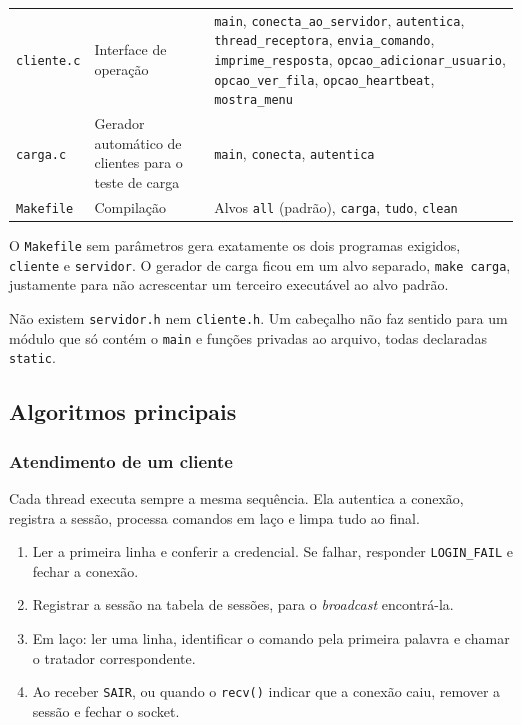 \documentclass[12pt,a4paper]{article}
\begin{document}
{\begin{longtable}{L{2.8cm} L{4.1cm} L{6.3cm}}
\addlinespace
\texttt{cliente.c} &
Interface de operação &
\texttt{main}, \texttt{conecta\_ao\_servidor}, \texttt{autentica}, \texttt{thread\_receptora}, \texttt{envia\_comando}, \texttt{imprime\_resposta}, \texttt{opcao\_adicionar\_usuario}, \texttt{opcao\_ver\_fila}, \texttt{opcao\_heartbeat}, \texttt{mostra\_menu} \\
\addlinespace
\texttt{carga.c} &
Gerador automático de clientes para o teste de carga &
\texttt{main}, \texttt{conecta}, \texttt{autentica} \\
\addlinespace
\texttt{Makefile} &
Compilação &
Alvos \texttt{all} (padrão), \texttt{carga}, \texttt{tudo}, \texttt{clean} \\
\bottomrule
\end{longtable}}

O \texttt{Makefile} sem parâmetros gera exatamente os dois programas exigidos,
\texttt{cliente} e \texttt{servidor}. O gerador de carga ficou em um alvo
separado, \texttt{make carga}, justamente para não acrescentar um terceiro
executável ao alvo padrão.

Não existem \texttt{servidor.h} nem \texttt{cliente.h}. Um cabeçalho não faz
sentido para um módulo que só contém o \texttt{main} e funções privadas ao
arquivo, todas declaradas \texttt{static}.

\subsection{Algoritmos principais}

\subsubsection*{Atendimento de um cliente}

Cada thread executa sempre a mesma sequência. Ela autentica a conexão, registra
a sessão, processa comandos em laço e limpa tudo ao final.

\begin{enumerate}
  \item Ler a primeira linha e conferir a credencial. Se falhar, responder
        \texttt{LOGIN\_FAIL} e fechar a conexão.
  \item Registrar a sessão na tabela de sessões, para o \textit{broadcast}
        encontrá-la.
  \item Em laço: ler uma linha, identificar o comando pela primeira palavra e
        chamar o tratador correspondente.
  \item Ao receber \texttt{SAIR}, ou quando o \texttt{recv()} indicar que a
        conexão caiu, remover a sessão e fechar o socket.
\end{enumerate}
\end{document}
